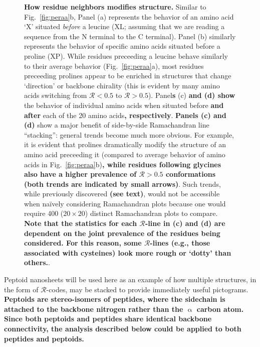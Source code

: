 \documentclass[fleqn,10pt,lineno]{wlpeerj} %
\newcommand{\Fig}[1]{Fig.~\ref{#1}}
\newcommand{\n}[1]{{\textbf{\color{red}#1}}}
\newcommand{\rr}{$\mathcal{R}$\xspace}
\begin{document}
\begin{figure}
\begin{adjustwidth}{-1in}{0in}
\caption{\textbf{\n{How residue neighbors modifies structure.}} Similar to \Fig{fig:peraa}b, Panel (a) represents the behavior of an amino acid `X' situated {\it before} a leucine (XL; assuming that we are reading a sequence from the N terminal to the C terminal). Panel (b) similarly represents the behavior of specific amino acids situated before a proline (XP). While residues preceeding a leucine behave similarly to their average behavior (\Fig{fig:peraa}a), most residues preceeding prolines appear to be enriched in structures that change `direction' or backbone chirality (this is evident by many amino acids switching from \rr$<0.5$ to \rr$>0.5$). 
Panel\n{s} (c) \n{and (d) show} the behavior of individual amino acids when situated before \n{and after} each of the 20 amino acids\n{, respectively}. 
\n{Panels (c) and (d)} show a major benefit of side-by-side Ramachandran line ``stacking'': general trends become much more obvious. For example, it is evident that prolines dramatically modify the structure of an amino acid preceeding it (compared to average behavior of amino acids in \Fig{fig:peraa}b)\n{, while residues following glycines also have a higher prevalence of $\mathcal{R} > 0.5$ conformations (both trends are indicated by small arrows)}. 
Such trends, while previously discovered \n{(see text)}, would not be accessible when na{\"i}vely considering Ramachandran plots because one would require 400 ($20\times 20$) distinct Ramachandran plots to compare. \n{Note that the statistics for each \rr-line in (c) and (d) are dependent on the joint prevalence of the residues being considered. For this reason, some \rr-lines (e.g., those associated with cysteines) look more rough or `dotty' than others.}.%
\label{fig:motifs}}
\end{adjustwidth}
\end{figure}

Peptoid nanosheets \citep{Mannige2015} will be used here as an example of how multiple structures, in the form of \rr-codes, may be stacked to provide immediately useful pictograms. \n{Peptoids are stereo-isomers of peptides, where the sidechain is attached to the backbone nitrogen 
rather than the $\upalpha$ carbon atom. Since both peptoids and peptides share identical backbone connectivity, the analysis described below could be applied to both peptides and peptoids.}
\end{document}
